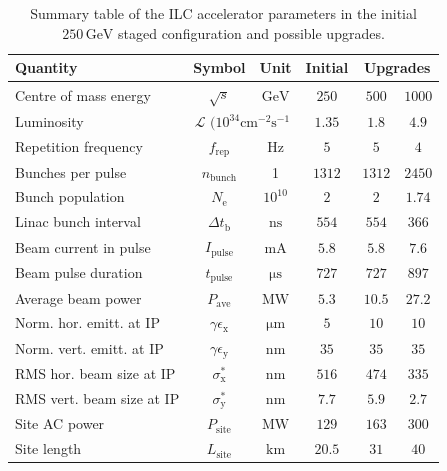 \documentclass[%
 reprint,
 amsmath,amssymb,
 aps,
]{revtex4-1}
\begin{document}
\begin{table}
\begin{tabular}{lccccc}
Quantity & Symbol & Unit & Initial &  \multicolumn{2}{c}{Upgrades} \\
\hline
Centre of mass energy & $\sqrt{s}$ & ${\mathrm{GeV}}$ & $250$ & $500$ & $1000$ \\
Luminosity & \multicolumn{2}{c}{${\mathcal{L}}$ $(10^{34}{\mathrm{cm^{-2}s^{-1}}}$})& $1.35$ & $1.8$ & $4.9$ \\
Repetition frequency &$f_{\mathrm{rep}}$ & ${\mathrm{Hz}}$  & $5$ & $5$ & $4$ \\
Bunches per pulse  &$n_{\mathrm{bunch}}$ & 1  & $1312$ & $1312$ & $2450$ \\
Bunch population  &$N_{\mathrm{e}}$ & $10^{10}$ &$2$ & $2$ & $1.74$ \\
Linac bunch interval & $\Delta t_{\mathrm{b}}$ & ${\mathrm{ns}}$ & $554$ & $554$ & $366$ \\
Beam current in pulse & $I_{\mathrm{pulse}}$ & ${\mathrm{mA}}$& $5.8$ & $5.8$ & $7.6$  \\
Beam pulse duration  & $t_{\mathrm{pulse}}$ & ${\mathrm{\mu s}}$ &$727$ & $727$ & $897$ \\
Average beam power  & $P_{\mathrm{ave}}$   & ${\mathrm{MW}}$ & $5.3$   &$10.5$  & $27.2$ \\  
Norm. hor. emitt. at IP & $\gamma\epsilon_{\mathrm{x}}$ & ${\mathrm{\mu m}}$& $5$ & $10$ & $10$  \\ 
Norm. vert. emitt. at IP & $\gamma\epsilon_{\mathrm{y}}$ & ${\mathrm{nm}}$ & $35$ & $35$ & $35$ \\ 
RMS hor. beam size at IP  & $\sigma^*_{\mathrm{x}}$ & ${\mathrm{nm}}$  & $516$ & $474$ & $335$ \\
RMS vert. beam size at IP &$\sigma^*_{\mathrm{y}}$ & ${\mathrm{nm}}$ & $7.7$  & $5.9$ & $2.7$ \\
Site AC power  & $P_{\mathrm{site}}$ &  ${\mathrm{MW}}$ & $129$ & $163$ & $300$ \\
Site length & $L_{\mathrm{site}}$ &  ${\mathrm{km}}$ & $20.5$ & $31$ & $40$ \\
\end{tabular}
\caption{Summary table of the ILC accelerator parameters in the initial $250\,{\mathrm{GeV}}$ staged configuration
and possible upgrades.
\label{tab:ilc-params}}
\end{table}
\end{document}
